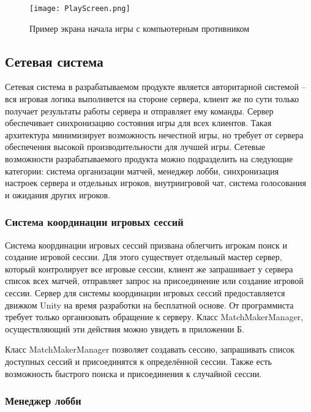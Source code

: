\begin{figure}[ht]
\centering
	\texttt{[image: PlayScreen.png]}
	\caption{Пример экрана начала игры с компьютерным противником}
	\label{Figure:Development:PlayScreen}
\end{figure}


\subsection{Сетевая система}

Сетевая система в разрабатываемом продукте является авторитарной системой -- вся игровая логика выполняется на стороне сервера, клиент же по сути только получает результаты работы сервера и отправляет ему команды. Сервер обеспечивает синхронизацию состояния игры для всех клиентов. Такая архитектура минимизирует возможность нечестной игры, но требует от сервера обеспечения высокой производительности для лучшей игры. Сетевые возможности разрабатываемого продукта можно подразделить на следующие категории: система организации матчей, менеджер лобби, синхронизация настроек сервера и отдельных игроков, внутриигровой чат, система голосования и ожидания других игроков.

\subsubsection{Система координации игровых сессий}

Система координации игровых сессий призвана облегчить игрокам поиск и создание игровой сессии. Для этого существует отдельный мастер сервер, который контролирует все игровые сессии, клиент же запрашивает у сервера список всех матчей, отправляет запрос на присоединение или создание игровой сессии. Сервер для системы координации игровых сессий предоставляется движком Unity на время разработки на бесплатной основе. От программиста требует только организовать обращение к серверу. Класс MatchMakerManager, осуществляющий эти действия можно увидеть в приложении Б.

Класс MatchMakerManager позволяет создавать сессию, запрашивать список доступных сессий и присоединятся к определённой сессии. Также есть возможность быстрого поиска и присоединения к случайной сессии.

\subsubsection{Менеджер лобби}

